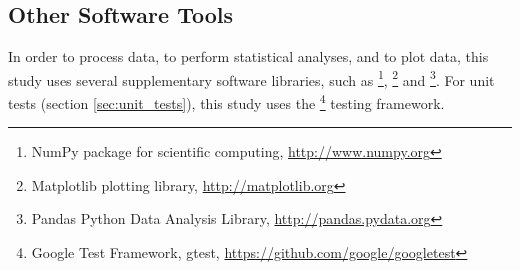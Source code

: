 
\subsection{Other Software Tools}

In order to process data, to perform statistical analyses, and to plot
data, this study uses several supplementary software libraries, such as
\footnote{NumPy package for scientific computing, \url{http://www.numpy.org}},
\footnote{Matplotlib plotting library, \url{http://matplotlib.org}}
and
\footnote{Pandas Python Data Analysis Library, \url{http://pandas.pydata.org}}.
For unit tests (section \ref{sec:unit_tests}), this study uses the
\footnote{Google Test Framework, gtest, \url{https://github.com/google/googletest}}
testing framework.

